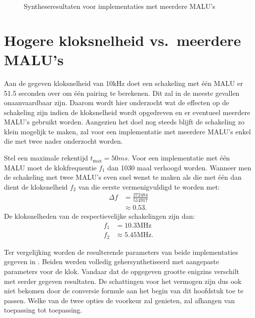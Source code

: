 \begin{figure}[h]
	\centering
		\caption{Syntheseresultaten voor implementaties met meerdere MALU's\label{figuur-resultaten-md}}
\end{figure}

\section{Hogere kloksnelheid vs.\ meerdere MALU's}

Aan de gegeven kloksnelheid van 10kHz doet een schakeling met \'e\'en MALU er 51.5 seconden over om \'e\'en pairing te berekenen. Dit zal  in de meeste gevallen onaanvaardbaar zijn. Daarom wordt hier onderzocht wat de effecten op de schakeling zijn indien de kloksnelheid wordt opgedreven en er eventueel meerdere MALU's gebruikt worden. Aangezien het doel nog steeds blijft de schakeling zo klein mogelijk te maken, zal voor een implementatie met meerdere MALU's enkel die met twee nader onderzocht worden.

Stel een maximale rekentijd $t_{\text{max}} = 50ms$. Voor een implementatie met \'e\'en MALU moet de klokfrequentie $f_1$ dan 1030 maal verhoogd worden. Wanneer men de schakeling met twee MALU's even snel wenst te maken als die met \'e\'en dan dient de kloksnelheid $f_2$ van die eerste vermenigvuldigd te worden met:
\[\begin{aligned}
\Delta f &= \frac{272484}{514917}\\
	&\approx 0.53.
\end{aligned}\]
De kloksnelheden van de respectievelijke schakelingen zijn dan:
\[\begin{aligned}
f_1	&= 10.3\text{MHz}\\
f_2	&\approx 5.45\text{MHz}.
\end{aligned}\]

Ter vergelijking worden de resulterende parameters van beide implementaties gegeven in . Beiden werden volledig gehersynthetiseerd met aangepaste parameters voor de klok. Vandaar dat de opgegeven grootte enigzins verschilt met eerder gegeven resultaten. De schattingen voor het vermogen zijn dus ook niet bekomen door de conversie formule aan het begin van dit hoofdstuk toe te passen. Welke van de twee opties de voorkeur zal genieten, zal afhangen van toepassing tot toepassing.


